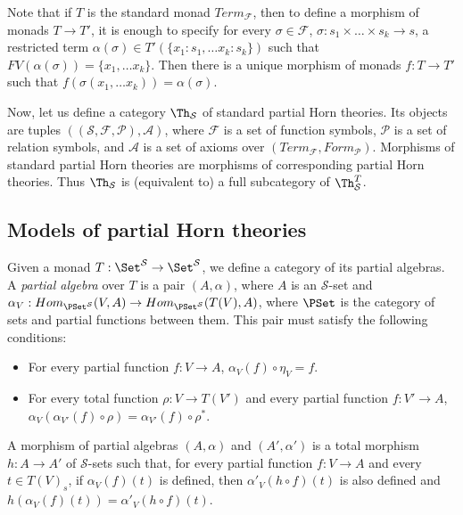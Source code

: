 Note that if $T$ is the standard monad $Term_\mathcal{F}$, then to define a morphism of monads $T \to T'$,
it is enough to specify for every $\sigma \in \mathcal{F}$, $\sigma : s_1 \times \ldots \times s_k \to s$,
a restricted term $\alpha(\sigma) \in T'(\{ x_1 : s_1, \ldots x_k : s_k \})$ such that $FV(\alpha(\sigma)) = \{ x_1, \ldots x_k \}$.
Then there is a unique morphism of monads $f : T \to T'$ such that $f(\sigma(x_1, \ldots x_k)) = \alpha(\sigma)$.

Now, let us define a category $\Th_\mathcal{S}$ of standard partial Horn theories.
Its objects are tuples $((\mathcal{S},\mathcal{F},\mathcal{P}),\mathcal{A})$, where $\mathcal{F}$ is a set of function symbols,
    $\mathcal{P}$ is a set of relation symbols, and $\mathcal{A}$ is a set of axioms over $(Term_\mathcal{F},Form_\mathcal{P})$.
Morphisms of standard partial Horn theories are morphisms of corresponding partial Horn theories.
Thus $\Th_\mathcal{S}$ is (equivalent to) a full subcategory of $\Th^T_\mathcal{S}$.

\subsection{Models of partial Horn theories}

Given a monad $T : \Set^\mathcal{S} \to \Set^\mathcal{S}$, we define a category of its partial algebras.
A \emph{partial algebra} over $T$ is a pair $(A,\alpha)$, where $A$ is an $\mathcal{S}$-set and $\alpha_V : Hom_{\PSet^\mathcal{S}}(V,A) \to Hom_{\PSet^\mathcal{S}}(T(V),A)$,
    where $\PSet$ is the category of sets and partial functions between them.
This pair must satisfy the following conditions:
\begin{itemize}
\item For every partial function $f : V \to A$, $\alpha_V(f) \circ \eta_V = f$.
\item For every total function $\rho : V \to T(V')$ and every partial function $f : V' \to A$, $\alpha_V(\alpha_{V'}(f) \circ \rho) = \alpha_{V'}(f) \circ \rho^*$.
\end{itemize}
A morphism of partial algebras $(A,\alpha)$ and $(A',\alpha')$ is a total morphism $h : A \to A'$ of $\mathcal{S}$-sets
    such that, for every partial function $f : V \to A$ and every $t \in T(V)_s$, if $\alpha_V(f)(t)$ is defined,
    then $\alpha'_V(h \circ f)(t)$ is also defined and $h(\alpha_V(f)(t)) = \alpha'_V(h \circ f)(t)$.

